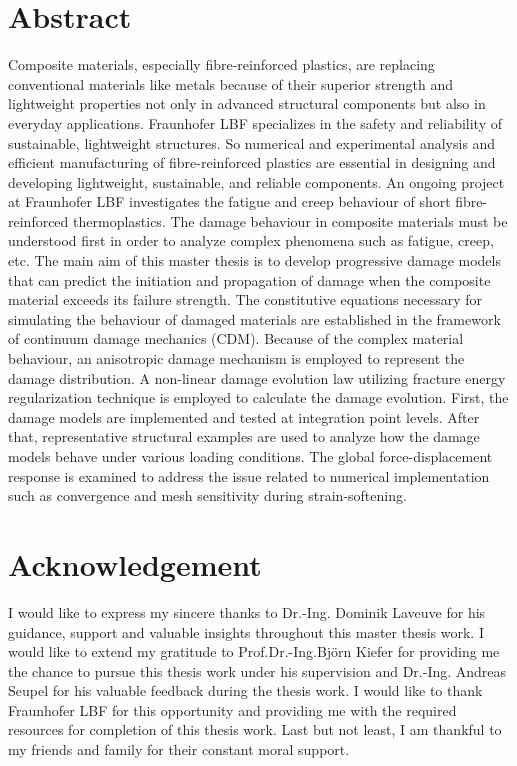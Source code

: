 \documentclass[12pt,a4paper,twoside,openright]{report}
\begin{document}


\clearpage
\thispagestyle{empty}
\hfill
\clearpage
{}
\vspace*{2cm}
\section*{\LARGE{Abstract} }
\pagestyle{empty}
\indent\indent\indent Composite materials, especially fibre-reinforced plastics, are replacing conventional materials like metals because of their superior strength and lightweight properties not only in advanced structural components but also in everyday applications. Fraunhofer LBF specializes in the safety and reliability of sustainable, lightweight structures. So numerical and experimental analysis and efficient manufacturing of fibre-reinforced plastics are essential in designing and developing lightweight, sustainable, and reliable components. An ongoing project at Fraunhofer LBF investigates the fatigue and creep behaviour of short fibre-reinforced thermoplastics. The damage behaviour in composite materials must be understood first in order to analyze complex phenomena such as fatigue, creep, etc. The main aim of this master thesis is to develop progressive damage models that can predict the initiation and propagation of damage when the composite material exceeds its failure strength. The constitutive equations necessary for simulating the behaviour of damaged materials are established in the framework of continuum damage mechanics (CDM). Because of the complex material behaviour, an anisotropic damage mechanism is employed to represent the damage distribution. A non-linear damage evolution law utilizing fracture energy regularization technique is employed to calculate the damage evolution.  First, the damage models are implemented and tested at integration point levels. After that, representative structural examples are used to analyze how the damage models behave under various loading conditions. The global force-displacement response is examined to address the issue related to numerical implementation such as convergence and mesh sensitivity during strain-softening. 



\clearpage
\thispagestyle{empty}
\hfill
\clearpage
\vspace*{2cm}
\section*{\LARGE{Acknowledgement} }
\vspace*{1cm}
\indent\indent\indent   I would like to express my sincere thanks to Dr.-Ing. Dominik Laveuve for his guidance, support and valuable insights throughout this master thesis work.  I would like to extend my gratitude to Prof.Dr.-Ing.Björn Kiefer for providing me the chance to pursue this thesis work under his supervision and Dr.-Ing. Andreas Seupel for his valuable feedback during the thesis work.  I would like to thank Fraunhofer LBF for this opportunity and providing me with the required resources for completion of this thesis work. Last but not least, I am thankful to my friends and family for their constant moral support.
\end{document}
